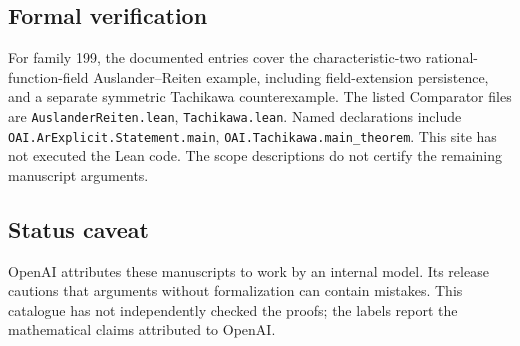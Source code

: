 \documentclass[11pt]{article}
\begin{document}
\subsection{Formal verification}
For family 199, the documented entries cover the characteristic-two rational-function-field Auslander--Reiten example, including field-extension persistence, and a separate symmetric Tachikawa counterexample. The listed Comparator files are \texttt{AuslanderReiten.lean}, \texttt{Tachikawa.lean}. Named declarations include \texttt{OAI.ArExplicit.Statement.main}, \texttt{OAI.Tachikawa.main\_theorem}. This site has not executed the Lean code. The scope descriptions do not certify the remaining manuscript arguments.

\subsection{Status caveat}
OpenAI attributes these manuscripts to work by an internal model. Its release cautions that arguments without formalization can contain mistakes. This catalogue has not independently checked the proofs; the labels report the mathematical claims attributed to OpenAI.
\end{document}
